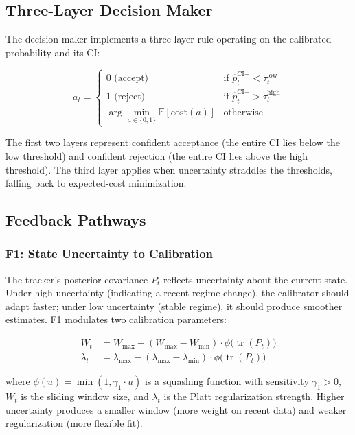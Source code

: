 \documentclass[12pt,a4paper]{article}
\newcommand{\tr}{\operatorname{tr}}
\begin{document}
\subsection{Three-Layer Decision Maker}

The decision maker implements a three-layer rule operating on the calibrated probability and its CI:

\begin{equation}
    a_t = \begin{cases}
    0 \text{ (accept)} & \text{if } \hat{p}^{\text{CI}+}_t < \tau^{\text{low}}_t \\
    1 \text{ (reject)} & \text{if } \hat{p}^{\text{CI}-}_t > \tau^{\text{high}}_t \\
    \arg\min_{a \in \{0,1\}} \mathbb{E}[ \text{cost}(a) ] & \text{otherwise}
    \end{cases} \label{eq:decision}
\end{equation}

The first two layers represent confident acceptance (the entire CI lies below the low threshold) and confident rejection (the entire CI lies above the high threshold). The third layer applies when uncertainty straddles the thresholds, falling back to expected-cost minimization.

\subsection{Feedback Pathways}

\subsubsection{F1: State Uncertainty to Calibration}

The tracker's posterior covariance $P_t$ reflects uncertainty about the current state. Under high uncertainty (indicating a recent regime change), the calibrator should adapt faster; under low uncertainty (stable regime), it should produce smoother estimates. F1 modulates two calibration parameters:

\begin{align}
    W_t &= W_{\max} - (W_{\max} - W_{\min}) \cdot \phi\big(\tr(P_t)\big) \label{eq:f1_window} \\
    \lambda_t &= \lambda_{\max} - (\lambda_{\max} - \lambda_{\min}) \cdot \phi\big(\tr(P_t)\big) \label{eq:f1_reg}
\end{align}

where $\phi(u) = \min(1, \gamma_1 \cdot u)$ is a squashing function with sensitivity $\gamma_1 > 0$, $W_t$ is the sliding window size, and $\lambda_t$ is the Platt regularization strength. Higher uncertainty produces a smaller window (more weight on recent data) and weaker regularization (more flexible fit).
\end{document}
